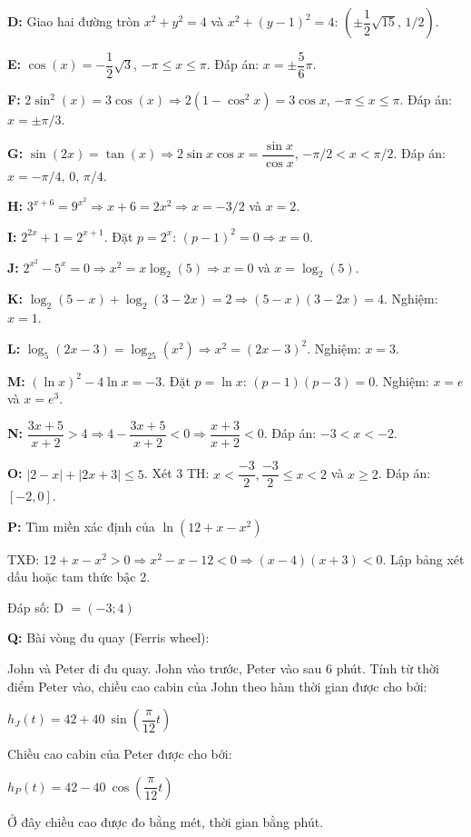 \documentclass[12pt,a4paper]{article}
\begin{document}
\textbf{D:} Giao hai đường tròn $x^2+y^2=4$ và $x^2+(y-1)^2=4$: $(\pm\dfrac{1}{2}\sqrt{15},\,1/2)$.

\textbf{E:} $\cos(x) = -\dfrac{1}{2}\sqrt{3}$, $-\pi \le x \le \pi$. Đáp án: $x = \pm\dfrac{5}{6}\pi$.

\textbf{F:} $2\sin^2(x) = 3\cos(x) \Rightarrow 2(1 - \cos^2 x) = 3 \cos x$, $-\pi \le x \le \pi$. Đáp án: $x = \pm\pi/3$.

\textbf{G:} $\sin(2x) = \tan(x) \Rightarrow 2\sin x \cos x = \dfrac{\sin x}{\cos x}$, $-\pi/2 < x < \pi/2$. Đáp án: $x = -\pi/4,\,0,\,\pi/4$.

\textbf{H:} $3^{x+6} = 9^{x^2} \Rightarrow x+6=2x^2 \Rightarrow x = -3/2$ và $x = 2$.

\textbf{I:} $2^{2x}+1=2^{x+1}$. Đặt $p=2^x$: $(p-1)^2=0 \Rightarrow x=0$.

\textbf{J:} $2^{x^2}-5^x=0 \Rightarrow x^2 = x\log_2(5) \Rightarrow x=0$ và $x=\log_2(5)$.

\textbf{K:} $\log_2(5-x)+\log_2(3-2x)=2 \Rightarrow (5-x)(3-2x)=4$. Nghiệm: $x=1$.

\textbf{L:} $\log_5(2x-3) = \log_{25}(x^2) \Rightarrow x^2=(2x-3)^2$. Nghiệm: $x=3$.

\textbf{M:} $(\ln x)^2 - 4\ln x = -3$. Đặt $p=\ln x$: $(p-1)(p-3)=0$. Nghiệm: $x=e$ và $x=e^3$.

\textbf{N:} $\dfrac{3x+5}{x+2} > 4 \Rightarrow 4 - \dfrac{3x+5}{x+2} < 0 \Rightarrow \dfrac{x+3}{x+2} < 0$. Đáp án: $-3 < x < -2$.

\textbf{O:} $|2-x|+|2x+3| \le 5$. Xét 3 TH: $x < \dfrac{-3}{2}, \dfrac{-3}{2} \le x < 2$ và $x \ge 2$. Đáp án: $[-2,0]$.

\textbf{P:} Tìm miền xác định của $\ln(12 + x - x^2)$

TXĐ: $12 + x - x^2 > 0 \Rightarrow x^2 - x - 12 < 0 \Rightarrow (x - 4)(x + 3) < 0$. Lập bảng xét dấu hoặc tam thức bậc 2.

Đáp số: D $= (-3; 4)$

\textbf{Q:} Bài vòng đu quay (Ferris wheel):

John và Peter đi đu quay. John vào trước, Peter vào sau 6 phút. Tính từ thời điểm Peter vào, chiều cao cabin của John theo hàm thời gian được cho bởi:

\(h_{J}(t)=42+40~\sin (\dfrac{\pi }{12}t)\)

Chiều cao cabin của Peter được cho bởi:

\(h_{P}(t)=42-40~\cos (\dfrac{\pi }{12}t)\)

Ở đây chiều cao được đo bằng mét, thời gian bằng phút.
\end{document}
